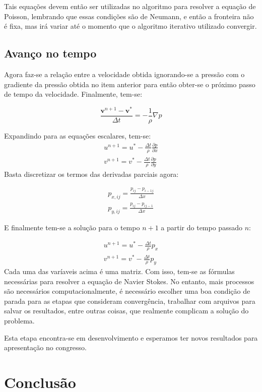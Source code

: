 \documentclass[journal]{IEEEtran}
\begin{document}
Tais equações devem então ser utilizadas no algoritmo para resolver a equação de Poisson, lembrando que essas condições são de Neumann, e então a fronteira não é fixa, mas irá variar até o momento que o algoritmo iterativo utilizado convergir.
\subsection{Avanço no tempo}
Agora faz-se a relação entre a velocidade obtida ignorando-se a pressão com o gradiente da pressão obtida no item anterior para então obter-se o próximo passo de tempo da velocidade. Finalmente, tem-se: 

\begin{equation}
\frac{\textbf{v}^{n+1}-\textbf{v}^*}{\Delta t}=-\frac{1}{\rho}\nabla p
\end{equation}

Expandindo para as equações escalares, tem-se:
\begin{eqnarray}
u^{n+1}=u^*-\frac{\Delta t}{\rho}\frac{\partial p}{\partial x}\\
v^{n+1}=v^*-\frac{\Delta t}{\rho}\frac{\partial p}{\partial y}
\end{eqnarray}
Basta discretizar os termos das derivadas parciais agora:

\begin{eqnarray}
p_{x,ij}=\frac{p_{ij}-p_{i-1j}}{\Delta x}\\
p_{y,ij}=\frac{p_{ij}-p_{ij-1}}{\Delta x}
\end{eqnarray}

E finalmente tem-se a solução para o tempo $n+1$ a partir do tempo passado $n$:

\begin{eqnarray}
u^{n+1}=u^*-\frac{\Delta t}{\rho}p_x\\
v^{n+1}=v^*-\frac{\Delta t}{\rho}p_y
\end{eqnarray}
Cada uma das varíaveis acima é uma matriz. Com isso, tem-se as fórmulas necessárias para resolver a equação de Navier Stokes. No entanto, mais processos são necessários computacionalmente, é necessário escolher uma boa condição de parada para as etapas que consideram convergência, trabalhar com arquivos para salvar os resultados, entre outras coisas, que realmente complicam a solução do problema.

Esta etapa encontra-se em desenvolvimento e esperamos ter novos resultados para apresentação no congresso.
\section{Conclusão}
\end{document}
